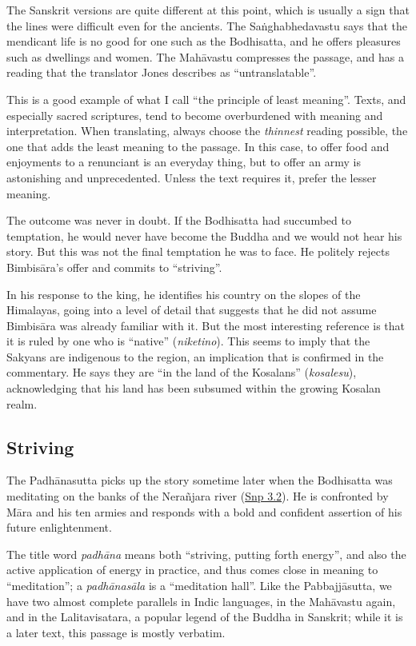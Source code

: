 \documentclass[12pt,openany]{book}%
\begin{document}
The Sanskrit versions are quite different at this point, which is usually a sign that the lines were difficult even for the ancients. The \textsanskrit{Saṅghabhedavastu} says that the mendicant life is no good for one such as the Bodhisatta, and he offers pleasures such as dwellings and women. The \textsanskrit{Mahāvastu} compresses the passage, and has a reading that the translator Jones describes as “untranslatable”.

This is a good example of what I call “the principle of least meaning”. Texts, and especially sacred scriptures, tend to become overburdened with meaning and interpretation. When translating, always choose the \emph{thinnest} reading possible, the one that adds the least meaning to the passage. In this case, to offer food and enjoyments to a renunciant is an everyday thing, but to offer an army is astonishing and unprecedented. Unless the text requires it, prefer the lesser meaning.

The outcome was never in doubt. If the Bodhisatta had succumbed to temptation, he would never have become the Buddha and we would not hear his story. But this was not the final temptation he was to face. He politely rejects \textsanskrit{Bimbisāra}’s offer and commits to “striving”.

In his response to the king, he identifies his country on the slopes of the Himalayas, going into a level of detail that suggests that he did not assume \textsanskrit{Bimbisāra} was already familiar with it. But the most interesting reference is that it is ruled by one who is “native” (\textit{niketino}). This seems to imply that the Sakyans are indigenous to the region, an implication that is confirmed in the commentary. He says they are “in the land of the Kosalans” (\textit{kosalesu}), acknowledging that his land has been subsumed within the growing Kosalan realm.

\subsection*{Striving}

The \textsanskrit{Padhānasutta} picks up the story sometime later when the Bodhisatta was meditating on the banks of the \textsanskrit{Nerañjara} river (\href{https://suttacentral.net/snp3.2/en/sujato}{Snp 3.2}). He is confronted by \textsanskrit{Māra} and his ten armies and responds with a bold and confident assertion of his future enlightenment.

The title word \textit{\textsanskrit{padhāna}} means both “striving, putting forth energy”, and also the active application of energy in practice, and thus comes close in meaning to “meditation”; a \textit{\textsanskrit{padhānasāla}} is a “meditation hall”. Like the \textsanskrit{Pabbajjāsutta}, we have two almost complete parallels in Indic languages, in the \textsanskrit{Mahāvastu} again, and in the Lalitavisatara, a popular legend of the Buddha in Sanskrit; while it is a later text, this passage is mostly verbatim.
\end{document}
